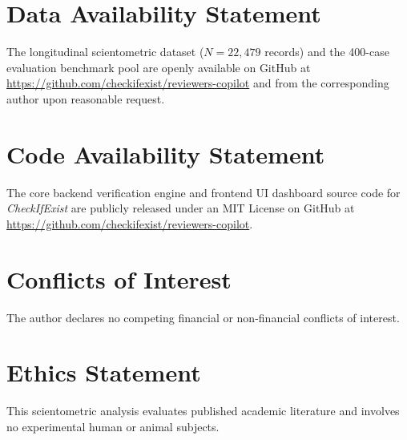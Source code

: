 \documentclass[11pt, a4paper]{article}
\begin{document}
\section*{Data Availability Statement}
The longitudinal scientometric dataset ($N=22,479$ records) and the 400-case evaluation benchmark pool are openly available on GitHub at \url{https://github.com/checkifexist/reviewers-copilot} and from the corresponding author upon reasonable request.

\section*{Code Availability Statement}
The core backend verification engine and frontend UI dashboard source code for \textit{CheckIfExist} are publicly released under an MIT License on GitHub at \url{https://github.com/checkifexist/reviewers-copilot}.

\section*{Conflicts of Interest}
The author declares no competing financial or non-financial conflicts of interest.

\section*{Ethics Statement}
This scientometric analysis evaluates published academic literature and involves no experimental human or animal subjects.



\end{document}
